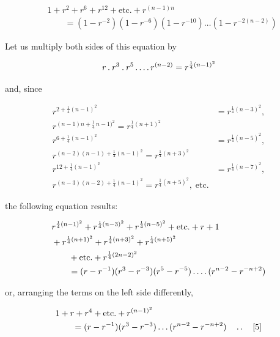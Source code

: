 \[
\begin{aligned}
&1+r^2+r^6+r^{12}+\text{etc.}+r^{(n-1)n}\\&\qquad=(1-r^{-2})(1-r^{-6})(1-r^{-10})\ldots(1-r^{-2(n-2)})
\end{aligned}
\]

Let us multiply both sides of this equation by

\[
\begin{aligned}
r\mathbin{.} r^3\mathbin{.} r^5\mathinner{.\,.\,.\,.} r^{(n-2)}=r^{\frac14(n-1)^2}
\end{aligned}
\]

and, since

\[
\begin{aligned}
r^{2+\frac14(n-1)^2}&=r^{\frac14(n-3)^2},\\r^{(n-1)n+\frac14\,n-1)^2}=r^{\frac14(n+1)^2}\\
r^{6+\frac14(n-1)^2}&=r^{\frac14(n-5)^2},\\r^{(n-2)(n-1)+\frac14(n-1)^2}=r^{\frac14(n+3)^2}\\
r^{12+\frac14(n-1)^2}&=r^{\frac14(n-7)^2},\\r^{(n-3)(n-2)+\frac14(n-1)^2}=r^{\frac14(n+5)^2},\;\text{etc.}
\end{aligned}
\]

the following equation results:

\[
\begin{aligned}
&r^{\frac14(n-1)^2}+r^{\frac14(n-3)^2}+r^{\frac14(n-5)^2}+\text{etc.}+r+1\\
&+r^{\frac14(n+1)^2}+r^{\frac14(n+3)^2}+r^{\frac14(n+5)^2}\\&\qquad+\text{etc.}+r^{\frac14(2n-2)^2}\\
&\qquad=(r-r^{-1})(r^3-r^{-3})(r^5-r^{-5})\mathinner{.\,.\,.\,.}(r^{n-2}-r^{-n+2})
\end{aligned}
\]

or, arranging the terms on the left side differently,

\[
\begin{aligned}
&1+r+r^4+\text{etc.}+r^{(n-1)^2}\\&\qquad=(r-r^{-1})(r^3-r^{-3})\ldots(r^{n-2}-r^{-n+2})\quad\mathinner{.\,.}\quad[5]
\end{aligned}
\]
